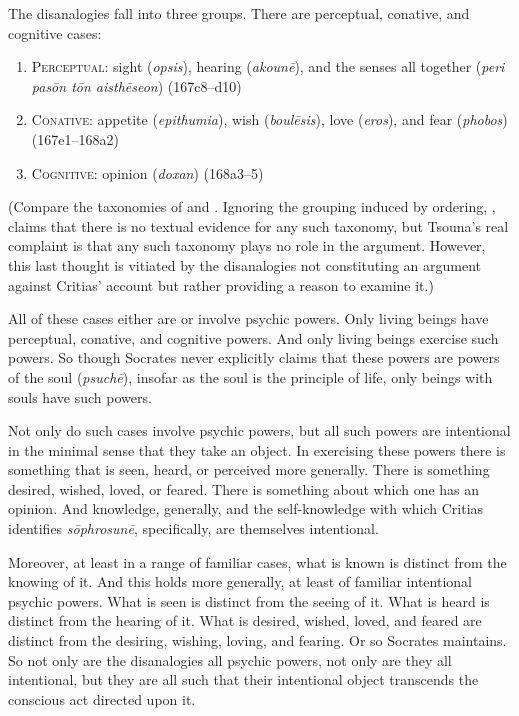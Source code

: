 The disanalogies fall into three groups. There are perceptual, conative, and cognitive cases:
\begin{enumerate}[(1)]
	\item \textsc{Perceptual}: sight (\emph{opsis}), hearing (\emph{akounē}), and the senses all together (\emph{peri pasōn tōn aisthēseon}) (167c8–d10)
	\item \textsc{Conative}: appetite (\emph{epithumia}), wish (\emph{boulēsis}), love (\emph{eros}), and fear (\emph{phobos}) (167e1–168a2)
	\item \textsc{Cognitive}: opinion (\emph{doxan}) (168a3–5)
\end{enumerate}
(Compare the taxonomies of \citealt[114–8]{Hyland:1981aa} and \citealt[90]{Schmid:1998aa}. Ignoring the grouping induced by ordering, \citealt[207 n37]{Tsouna:2022aa}, claims that there is no textual evidence for any such taxonomy, but Tsouna's real complaint is that any such taxonomy plays no role in the argument. However, this last thought is vitiated by the disanalogies not constituting an argument against Critias' account but rather providing a reason to examine it.) 

All of these cases either are or involve psychic powers. Only living beings have perceptual, conative, and cognitive powers. And only living beings exercise such powers. So though Socrates never explicitly claims that these powers are powers of the soul (\emph{psuchē}), insofar as the soul is the principle of life, only beings with souls have such powers. 

Not only do such cases involve psychic powers, but all such powers are intentional in the minimal sense that they take an object. In exercising these powers there is something that is seen, heard, or perceived more generally. There is something desired, wished, loved, or feared. There is something about which one has an opinion. And knowledge, generally, and the self-knowledge with which Critias identifies \emph{sōphrosunē}, specifically, are themselves intentional. 

Moreover, at least in a range of familiar cases, what is known is distinct from the knowing of it. And this holds more generally, at least of familiar intentional psychic powers. What is seen is distinct from the seeing of it. What is heard is distinct from the hearing of it. What is desired, wished, loved, and feared are distinct from the desiring, wishing, loving, and fearing. Or so Socrates maintains. So not only are the disanalogies all psychic powers, not only are they all intentional, but they are all such that their intentional object transcends the conscious act directed upon it.

